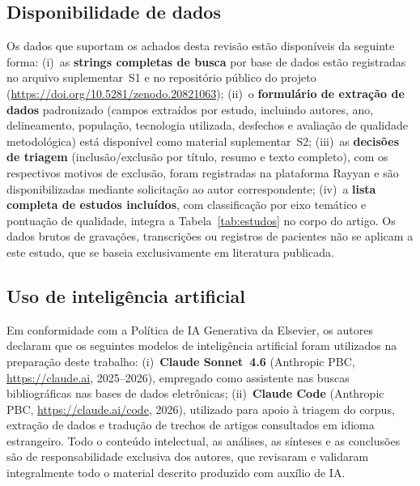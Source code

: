 \documentclass[a4paper,fleqn]{cas-sc}
\begin{document}
\subsection*{Disponibilidade de dados}
Os dados que suportam os achados desta revisão estão disponíveis da
seguinte forma:
(i)~as \textbf{strings completas de busca} por base de dados estão
registradas no arquivo suplementar~S1 e no repositório público do projeto
(\url{https://doi.org/10.5281/zenodo.20821063});
(ii)~o \textbf{formulário de extração de dados} padronizado (campos
extraídos por estudo, incluindo autores, ano, delineamento, população,
tecnologia utilizada, desfechos e avaliação de qualidade metodológica)
está disponível como material suplementar~S2;
(iii)~as \textbf{decisões de triagem} (inclusão/exclusão por título,
resumo e texto completo), com os respectivos motivos de exclusão,
foram registradas na plataforma Rayyan \citep{Ouzzani2016} e são
disponibilizadas mediante solicitação ao autor correspondente;
(iv)~a \textbf{lista completa de estudos incluídos}, com classificação
por eixo temático e pontuação de qualidade, integra a Tabela~\ref{tab:estudos}
no corpo do artigo.
Os dados brutos de gravações, transcrições ou registros de pacientes
não se aplicam a este estudo, que se baseia exclusivamente em literatura
publicada.

\subsection*{Uso de inteligência artificial}
Em conformidade com a Política de IA Generativa da Elsevier, os autores
declaram que os seguintes modelos de inteligência artificial foram
utilizados na preparação deste trabalho:
(i)~\textbf{Claude Sonnet~4.6} (Anthropic PBC,
\url{https://claude.ai}, 2025--2026), empregado como assistente nas buscas
bibliográficas nas bases de dados eletrônicas;
(ii)~\textbf{Claude Code} (Anthropic PBC,
\url{https://claude.ai/code}, 2026), utilizado para apoio à triagem do
corpus, extração de dados e tradução de trechos de artigos consultados em
idioma estrangeiro.
Todo o conteúdo intelectual, as análises, as sínteses e as conclusões
são de responsabilidade exclusiva dos autores, que revisaram e validaram
integralmente todo o material descrito produzido com auxílio de IA\@.

\printcredits



\end{document}
